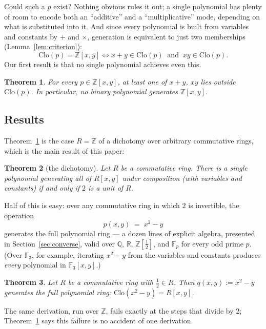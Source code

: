 \documentclass[11pt]{article}
\newtheorem{theorem}{Theorem}[section]
\theoremstyle{definition}
\theoremstyle{remark}
\newcommand{\F}{\mathbb{F}}
\newcommand{\Z}{\mathbb{Z}}
\newcommand{\Q}{\mathbb{Q}}
\newcommand{\Clo}{\mathrm{Clo}}
\begin{document}
Could such a $p$ exist?  Nothing obvious rules it out; a single
polynomial has plenty of room to encode both an ``additive'' and a
``multiplicative'' mode, depending on what is substituted into it.
And since every polynomial is built from variables and constants by
$+$ and $\times$, generation is equivalent to just two
memberships (Lemma~\ref{lem:criterion}):
\[
  \Clo(p) = \Z[x,y] \iff x + y \in \Clo(p) \ \text{ and } \
  xy \in \Clo(p).
\]
Our first result is that no single polynomial achieves even this.

\begin{theorem}\label{thm:Z}
For every $p \in \Z[x,y]$, at least one of $x+y$, $xy$ lies outside
$\Clo(p)$.  In particular, no binary polynomial generates $\Z[x,y]$.
\end{theorem}

\subsection{Results}\label{sec:results}

Theorem~\ref{thm:Z} is the case $R = \Z$ of a dichotomy over
arbitrary commutative rings, which is the main result of this paper:

\begin{theorem}[the dichotomy]\label{thm:dichotomy}
Let $R$ be a commutative ring.  There is a single polynomial
generating all of $R[x,y]$ under composition (with variables and
constants) if and only if $2$ is a unit of $R$.
\end{theorem}

Half of this is easy: over any commutative ring in which $2$
is invertible, the operation
\[
  p(x,y) \;=\; x^2 - y
\]
generates the full polynomial ring --- a dozen lines of explicit
algebra, presented in
Section~\ref{sec:converse}, valid over $\Q$, $\mathbb{R}$,
$\Z[\tfrac12]$, and $\F_p$ for every odd prime $p$.  (Over $\F_3$,
for example, iterating $x^2 - y$ from the variables and constants
produces \emph{every} polynomial in $\F_3[x,y]$.)

\begin{theorem}\label{thm:converse}
Let $R$ be a commutative ring with $\tfrac12 \in R$.  Then
$q(x,y) := x^2 - y$ generates the full polynomial ring:
$\Clo(x^2 - y) = R[x,y]$.
\end{theorem}

The same derivation, run over $\Z$, fails exactly at the steps that
divide by $2$; Theorem~\ref{thm:Z} says this failure is no accident
of one derivation.
\end{document}
